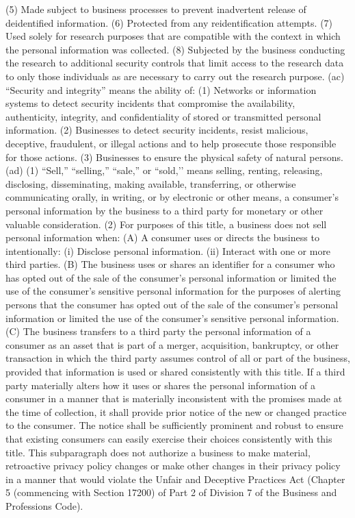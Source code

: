 (5) Made subject to business processes to prevent inadvertent release of deidentified information.
(6) Protected from any reidentification attempts.
(7) Used solely for research purposes that are compatible with the context in which the personal information was collected.
(8) Subjected by the business conducting the research to additional security controls that limit access to the research data to only those individuals as are necessary to carry out the research purpose.
(ac) “Security and integrity” means the ability of:
(1) Networks or information systems to detect security incidents that compromise the availability, authenticity, integrity, and confidentiality of stored or transmitted personal information.
(2) Businesses to detect security incidents, resist malicious, deceptive, fraudulent, or illegal actions and to help prosecute those responsible for those actions.
(3) Businesses to ensure the physical safety of natural persons.
(ad) (1) “Sell,” “selling,” “sale,” or “sold,’’ means selling, renting, releasing, disclosing, disseminating, making available, transferring, or otherwise communicating orally, in writing, or by electronic or other means, a consumer’s personal information by the business to a third party for monetary or other valuable consideration.
(2) For purposes of this title, a business does not sell personal information when:
(A) A consumer uses or directs the business to intentionally:
(i) Disclose personal information.
(ii) Interact with one or more third parties.
(B) The business uses or shares an identifier for a consumer who has opted out of the sale of the consumer’s personal information or limited the use of the consumer’s sensitive personal information for the purposes of alerting persons that the consumer has opted out of the sale of the consumer’s personal information or limited the use of the consumer’s sensitive personal information.
(C) The business transfers to a third party the personal information of a consumer as an asset that is part of a merger, acquisition, bankruptcy, or other transaction in which the third party assumes control of all or part of the business, provided that information is used or shared consistently with this title. If a third party materially alters how it uses or shares the personal information of a consumer in a manner that is materially inconsistent with the promises made at the time of collection, it shall provide prior notice of the new or changed practice to the consumer. The notice shall be sufficiently prominent and robust to ensure that existing consumers can easily exercise their choices consistently with this title. This subparagraph does not authorize a business to make material, retroactive privacy policy changes or make other changes in their privacy policy in a manner that would violate the Unfair and Deceptive Practices Act (Chapter 5 (commencing with Section 17200) of Part 2 of Division 7 of the Business and Professions Code).
